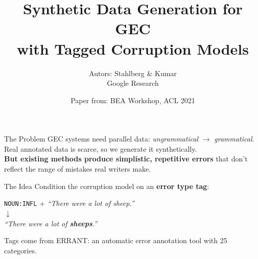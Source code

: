 \documentclass[aspectratio=169]{beamer}
\title{Synthetic Data Generation for GEC\\with Tagged Corruption Models}
\author{Autors: Stahlberg \& Kumar \\ \small Google Research}
\date{Paper from: BEA Workshop, ACL 2021}
\newcommand{\errtag}[1]{\texttt{#1}}
\begin{document}

\begin{frame}
  \titlepage
\end{frame}


\begin{frame}{The Problem}
  GEC systems need parallel data: \textit{ungrammatical} $\to$ \textit{grammatical}.\\[1em]
  Real annotated data is scarce, so we generate it synthetically.\\[1em]
  \textbf{But existing methods produce simplistic, repetitive errors} that don't
  reflect the range of mistakes real writers make.
\end{frame}

\begin{frame}{The Idea}
  Condition the corruption model on an \textbf{error type tag}:

  \vspace{1.5em}
  \begin{center}
    \large
    \errtag{NOUN:INFL} + \textit{``There were a lot of sheep.''}\\[0.8em]
    $\downarrow$\\[0.8em]
    \textit{``There were a lot of \textbf{sheeps}.''}
  \end{center}

  \vspace{1.5em}
  Tags come from ERRANT: an automatic error annotation tool with 25 categories.
\end{frame}
\end{document}
